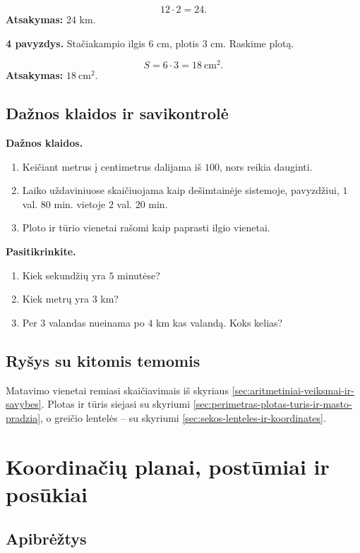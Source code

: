\[
12\cdot2=24.
\]
\textbf{Atsakymas:} \(24\) km.

\textbf{4 pavyzdys.} Stačiakampio ilgis \(6\) cm, plotis \(3\) cm. Raskime plotą.

\[
S=6\cdot3=18\ \text{cm}^2.
\]
\textbf{Atsakymas:} \(18\ \text{cm}^2\).

\subsection{Dažnos klaidos ir savikontrolė}

\textbf{Dažnos klaidos.}
\begin{enumerate}[label=\arabic*.]
\item Keičiant metrus į centimetrus dalijama iš \(100\), nors reikia dauginti.
\item Laiko uždaviniuose skaičiuojama kaip dešimtainėje sistemoje, pavyzdžiui, \(1\) val. \(80\) min. vietoje \(2\) val. \(20\) min.
\item Ploto ir tūrio vienetai rašomi kaip paprasti ilgio vienetai.
\end{enumerate}

\textbf{Pasitikrinkite.}
\begin{enumerate}[label=\arabic*.]
\item Kiek sekundžių yra \(5\) minutėse?
\item Kiek metrų yra \(3\) km?
\item Per \(3\) valandas nueinama po \(4\) km kas valandą. Koks kelias?
\end{enumerate}

\subsection{Ryšys su kitomis temomis}

Matavimo vienetai remiasi skaičiavimais iš skyriaus \ref{sec:aritmetiniai-veiksmai-ir-savybes}. Plotas ir tūris siejasi su skyriumi \ref{sec:perimetras-plotas-turis-ir-masto-pradzia}, o greičio lentelės -- su skyriumi \ref{sec:sekos-lenteles-ir-koordinates}.

\section{Koordinačių planai, postūmiai ir posūkiai}\label{sec:koordinaciu-planai-postumiai-ir-posukiai}

\subsection{Apibrėžtys}

